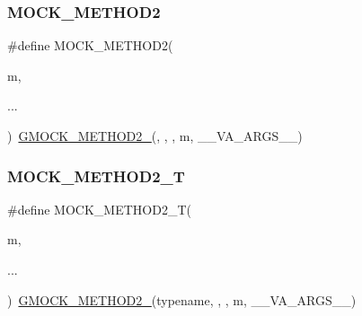 \mbox{\label{_obj__test_2lib_2googletest-release-1_88_81_2googlemock_2include_2gmock_2gmock-generated-function-mockers_8h_ab3fb7d97f21dc99205db38a14df4a1c4}} 
\subsubsection{\texorpdfstring{MOCK\_METHOD2}{MOCK\_METHOD2}}
{\footnotesize\ttfamily \#define M\+O\+C\+K\+\_\+\+M\+E\+T\+H\+O\+D2(\begin{DoxyParamCaption}\item[{}]{m,  }\item[{}]{... }\end{DoxyParamCaption})~\mbox{\hyperlink{_obj__test_2lib_2googletest-release-1_88_81_2googlemock_2include_2gmock_2gmock-generated-function-mockers_8h_a885295ca6bebb15efb3fc786218c5d47}{G\+M\+O\+C\+K\+\_\+\+M\+E\+T\+H\+O\+D2\+\_\+}}(, , , m, \+\_\+\+\_\+\+V\+A\+\_\+\+A\+R\+G\+S\+\_\+\+\_\+)}

\mbox{\label{_obj__test_2lib_2googletest-release-1_88_81_2googlemock_2include_2gmock_2gmock-generated-function-mockers_8h_adb6e8d8bd6ab614c62d8ecc2ec163e3c}} 
\subsubsection{\texorpdfstring{MOCK\_METHOD2\_T}{MOCK\_METHOD2\_T}}
{\footnotesize\ttfamily \#define M\+O\+C\+K\+\_\+\+M\+E\+T\+H\+O\+D2\+\_\+T(\begin{DoxyParamCaption}\item[{}]{m,  }\item[{}]{... }\end{DoxyParamCaption})~\mbox{\hyperlink{_obj__test_2lib_2googletest-release-1_88_81_2googlemock_2include_2gmock_2gmock-generated-function-mockers_8h_a885295ca6bebb15efb3fc786218c5d47}{G\+M\+O\+C\+K\+\_\+\+M\+E\+T\+H\+O\+D2\+\_\+}}(typename, , , m, \+\_\+\+\_\+\+V\+A\+\_\+\+A\+R\+G\+S\+\_\+\+\_\+)}

